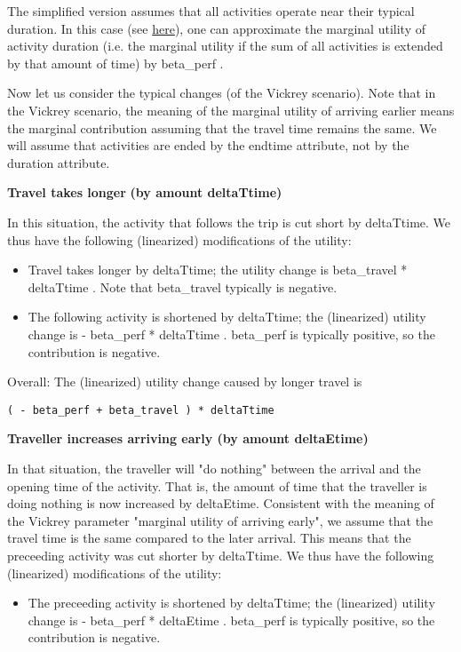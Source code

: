 \documentclass[a4paper,11pt]{report}
\begin{document}
The simplified version assumes that all activities operate near their typical duration. In this case (see \href{http://matsim.org/node/651}{here}),  one can approximate the marginal utility of activity duration (i.e. the  marginal utility if the sum of all activities is extended by that  amount of time) by beta\_perf .

Now let us consider the typical changes (of the Vickrey  scenario). Note that in the Vickrey scenario, the meaning of the  marginal utility of arriving earlier means the marginal contribution  assuming that the travel time remains the same. We will assume  that activities are ended by the endtime attribute, not by the duration  attribute.

\textbf{Travel takes longer}\textbf{ (by amount deltaTtime)}

In this situation, the activity that follows the trip is cut short by  deltaTtime. We thus have the following (linearized) modifications  of the utility:
\begin{itemize}
	\item Travel takes longer by deltaTtime; the utility change is  beta\_travel * deltaTtime . Note that beta\_travel typically is  negative.
	\item The following activity is shortened by deltaTtime; the (linearized)  utility change is - beta\_perf * deltaTtime . beta\_perf is  typically positive, so the contribution is negative.
\end{itemize}

Overall: The (linearized) utility change caused by longer travel is
\begin{verbatim}
( - beta_perf + beta_travel ) * deltaTtime

\end{verbatim}

\textbf{Traveller increases arriving early (by amount deltaEtime)}

In that situation, the traveller will "do nothing" between the  arrival and the opening time of the activity. That is, the amount  of time that the traveller is doing nothing is now increased by  deltaEtime. Consistent with the meaning of the Vickrey parameter  "marginal utility of arriving early", we assume that the travel time is  the same compared to the later arrival. This means that the preceeding  activity was cut shorter by deltaTtime. We thus have the following  (linearized) modifications of the utility:
\begin{itemize}
	\item The preceeding activity is shortened by deltaTtime; the  (linearized) utility change is - beta\_perf * deltaEtime .  beta\_perf is typically positive, so the contribution is negative.
\end{itemize}
\end{document}
